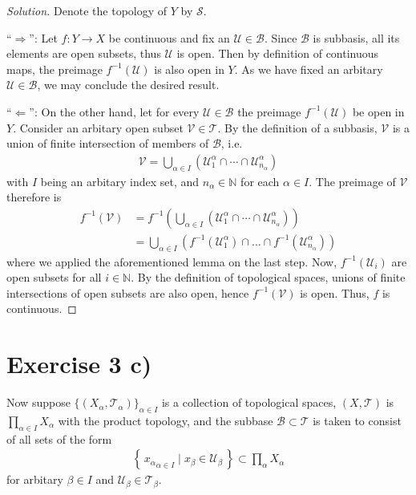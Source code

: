 \documentclass[a4paper]{article}
\theoremstyle{definition}
\newcommand{\makeset}[2]{\left\{\, #1 \mid #2 \,\right\}}
\begin{document}
\begin{proof}[Solution]
    Denote the topology of \(Y\) by \(\mathcal{S}\).

    ``\(\Rightarrow\)'': Let \(f: Y \longrightarrow X\) be continuous and fix an \(\mathcal{U} \in \mathcal{B}\). Since \(\mathcal{B}\) is subbasis, all its elements are open subsets, thus \(\mathcal{U}\) is open. Then by definition of continuous maps, the preimage \(f^{-1}(\mathcal{U})\) is also open in \(Y\). As we have fixed an arbitary \(\mathcal{U} \in \mathcal{B}\), we may conclude the desired result.

    ``\(\Leftarrow\)'': On the other hand, let for every \(\mathcal{U} \in \mathcal{B}\) the preimage \(f^{-1}(\mathcal{U})\) be open in \(Y\). Consider an arbitary open subset \(\mathcal{V} \in \mathcal{T}\). By the definition of a subbasis, \(\mathcal{V}\) is a union of finite intersection of members of \(\mathcal{B}\), i.e.
    \begin{align*}
        \mathcal{V} = \bigcup_{\alpha \in I} \left(\mathcal{U}_1^\alpha \cap \cdots \cap \mathcal{U}^\alpha_{n_\alpha} \right)
    \end{align*}
    with \(I\) being an arbitary index set, and \(n_\alpha \in \mathbb{N}\) for each \(\alpha \in I\). The preimage of \(\mathcal{V}\) therefore is
    \begin{align*}
        f^{-1}(\mathcal{V}) &= f^{-1}\left(\bigcup_{\alpha \in I} \left(\mathcal{U}_1^\alpha \cap \cdots \cap \mathcal{U}^\alpha_{n_\alpha} \right)\right) \\
        &= \bigcup_{\alpha \in I} \left( f^{-1}(\mathcal{U}_1^\alpha) \cap \ldots \cap f^{-1}(\mathcal{U}_{n_\alpha}^\alpha) \right)
    \end{align*}
    where we applied the aforementioned lemma on the last step. Now, \(f^{-1}(\mathcal{U}_i)\) are open subsets for all \(i \in \mathbb{N}\). By the definition of topological spaces, unions of finite intersections of open subsets are also open, hence \(f^{-1}(\mathcal{V})\) is open. Thus, \(f\) is continuous.
\end{proof}

\section*{Exercise 3 c)}

Now suppose \(\{(X_\alpha, \mathcal{T}_\alpha)\}_{\alpha \in I}\) is a collection of topological spaces, \((X, \mathcal{T})\) is \(\prod_{\alpha \in I} X_\alpha\) with the product topology, and the subbase \(\mathcal{B} \subset \mathcal{T}\) is taken to consist of all sets of the form
\begin{align*}
    \makeset{{x_\alpha}_{\alpha \in I}}{x_\beta \in \mathcal{U}_\beta} \subset \prod_\alpha X_\alpha
\end{align*}
for arbitary \(\beta \in I\) and \(\mathcal{U}_\beta \in \mathcal{T}_\beta\).
\end{document}
